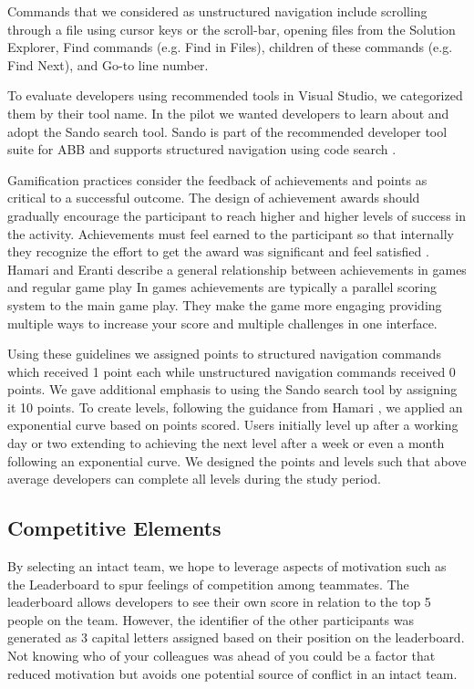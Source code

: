 \documentclass{sig-alternate}
\begin{document}
Commands that we considered as unstructured navigation include scrolling through a file using cursor keys or the scroll-bar, opening files from the Solution Explorer, Find commands (e.g. Find in Files), children of these commands (e.g. Find Next), and Go-to line number.

To evaluate developers using recommended tools in Visual Studio, we categorized them by their tool name.  In the pilot we wanted developers to learn about and adopt the Sando search tool.  Sando is part of the recommended developer tool suite for ABB and supports structured navigation using code search \cite{Shepherd2012Sando}.

Gamification practices consider the feedback of achievements and points as critical to a successful outcome.  The design of achievement awards should gradually encourage the participant to reach higher and higher levels of success in the activity.  Achievements must feel earned to the participant so that internally they recognize the effort to get the award was significant and feel satisfied  \cite{wbsnipes:Hamari2011Framework}.  Hamari and Eranti describe a general relationship between achievements in games and regular game play      In games achievements are typically a parallel scoring system to the main game play.  They make the game more engaging providing multiple ways to increase your score and multiple challenges in one interface.

Using these guidelines we assigned points to structured navigation commands which received 1 point each while unstructured navigation commands received 0 points.    We gave additional emphasis to using the Sando search tool by assigning it 10 points.  To create levels, following the guidance from Hamari \cite{wbsnipes:Hamari2011Framework}, we applied an exponential curve based on points scored.  Users initially level up after a working day or two extending to achieving the next level after a week or even a month following an exponential curve.  We designed the points and levels such that above average developers can complete all levels during the study period.

\subsection{Competitive Elements}

By selecting an intact team, we hope to leverage aspects of motivation such as the Leaderboard to spur feelings of competition among teammates.    The leaderboard allows developers to see their own score in relation to the top 5 people on the team.  However, the identifier of the other participants was generated as 3 capital letters assigned based on their position on the leaderboard.  Not knowing who of your colleagues was ahead of you could be a factor that reduced motivation but avoids one potential source of conflict in an intact team.
\end{document}
